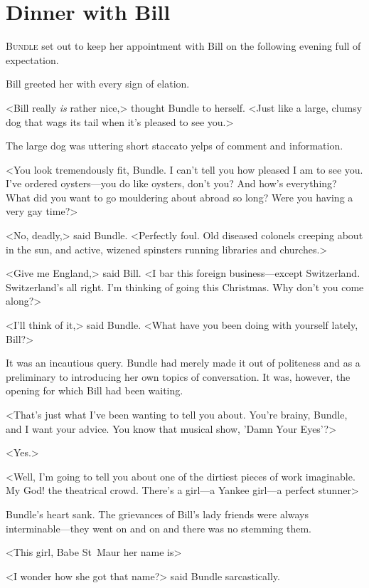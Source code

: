 \chapter{Dinner with Bill}

\lettrine{B}{undle} set out to keep her appointment with Bill on the following evening full of expectation.

\zz
Bill greeted her with every sign of elation.

\zz
<Bill really \emph{is} rather nice,> thought Bundle to herself. <Just like a large, clumsy dog that wags its tail when it's pleased to see you.>

The large dog was uttering short staccato yelps of comment and information.

<You look tremendously fit, Bundle. I can't tell you how pleased I am to see you. I've ordered oysters—you do like oysters, don't you? And how's everything? What did you want to go mouldering about abroad so long? Were you having a very gay time?>

<No, deadly,> said Bundle. <Perfectly foul. Old diseased colonels creeping about in the sun, and active, wizened spinsters running libraries and churches.>

<Give me England,> said Bill. <I bar this foreign business—except Switzerland. Switzerland's all right. I'm thinking of going this Christmas. Why don't you come along?>

<I'll think of it,> said Bundle. <What have you been doing with yourself lately, Bill?>

It was an incautious query. Bundle had merely made it out of politeness and as a preliminary to introducing her own topics of conversation. It was, however, the opening for which Bill had been waiting.

<That's just what I've been wanting to tell you about. You're brainy, Bundle, and I want your advice. You know that musical show, 'Damn Your Eyes'?>

<Yes.>

<Well, I'm going to tell you about one of the dirtiest pieces of work imaginable. My God! the theatrical crowd. There's a girl—a Yankee girl—a perfect stunner\longdash>

Bundle's heart sank. The grievances of Bill's lady friends were always interminable—they went on and on and there was no stemming them.

<This girl, Babe St~Maur her name is\longdash>

<I wonder how she got that name?> said Bundle sarcastically.

